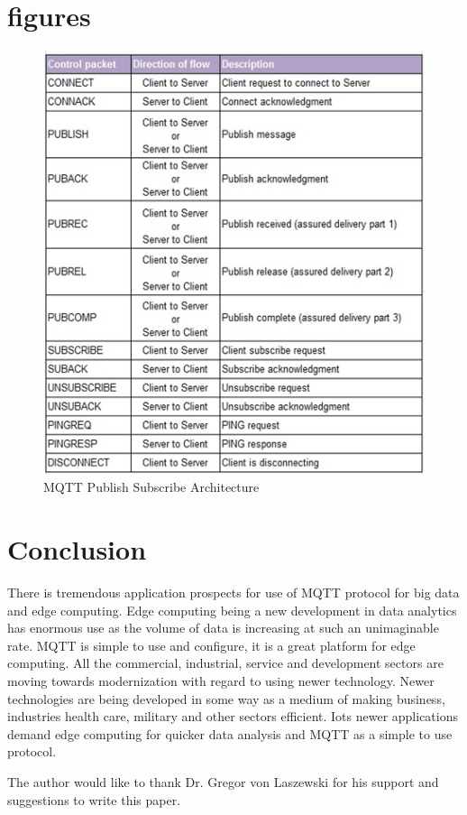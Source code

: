 \documentclass[sigconf]{acmart}
\begin{document}
\section{figures}
\begin{figure}
\includegraphics{images/MQTT.png}
\caption{MQTT Publish Subscribe Architecture} 

\end{figure}

\section{Conclusion}
There is tremendous application prospects for use of MQTT protocol for big data and edge computing. Edge computing being a new  development in data analytics  has enormous use as the volume of data is increasing at such an unimaginable rate. MQTT is simple to use and configure, it is a great platform for edge computing. All the commercial, industrial, service and development sectors are moving towards modernization with regard to using newer technology. Newer technologies are being developed in some way as a medium of making business, industries health care, military and other sectors efficient. Iots newer applications demand edge computing for quicker data analysis and MQTT as a simple to use protocol.  


\begin{acks}

  The author would like to thank Dr. Gregor von Laszewski for his
  support and suggestions to write this paper.

\end{acks}


 
\end{document}

